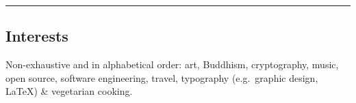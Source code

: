 \documentclass[10pt,a4paper]{article}
\newenvironment{indentsection}[1]%
{\begin{list}{}%
	{\setlength{\leftmargin}{#1}}%
	\item[]%
}
{\end{list}}
\begin{document}
\hrule
\vspace{-0.4em}
\subsection*{Interests}

\begin{indentsection}{\parindent}
\begin{description*}
	\item[Non-exhaustive and in alphabetical order:]
  art, Buddhism, cryptography, music, open source, software engineering, travel, typography (e.g.\ graphic design, \LaTeX) \& vegetarian cooking.
\end{description*}
\end{indentsection}
\end{document}
